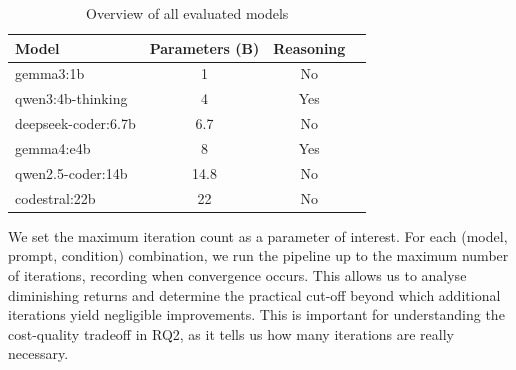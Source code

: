 \begin{table}[H]
	\centering
	\begin{tabular}{lccc}
		\toprule
		Model               & Parameters (B) & Reasoning \\
		\midrule
		gemma3:1b           & 1              & No        \\
		qwen3:4b-thinking   & 4              & Yes       \\
		deepseek-coder:6.7b & 6.7            & No        \\
		gemma4:e4b          & 8              & Yes       \\
		qwen2.5-coder:14b   & 14.8           & No        \\
		codestral:22b       & 22             & No        \\
		\bottomrule
	\end{tabular}
	\vspace{0.5em}
	\caption{Overview of all evaluated models}
	\label{tab:model-summary}
\end{table}




We set the maximum iteration count as a parameter of interest. For each (model, prompt, condition) combination, we run the pipeline up to the maximum number of iterations, recording when convergence occurs. This allows us to analyse diminishing returns and determine the practical cut-off beyond which additional iterations yield negligible improvements. This is important for understanding the cost-quality tradeoff in RQ2, as it tells us how many iterations are really necessary.


